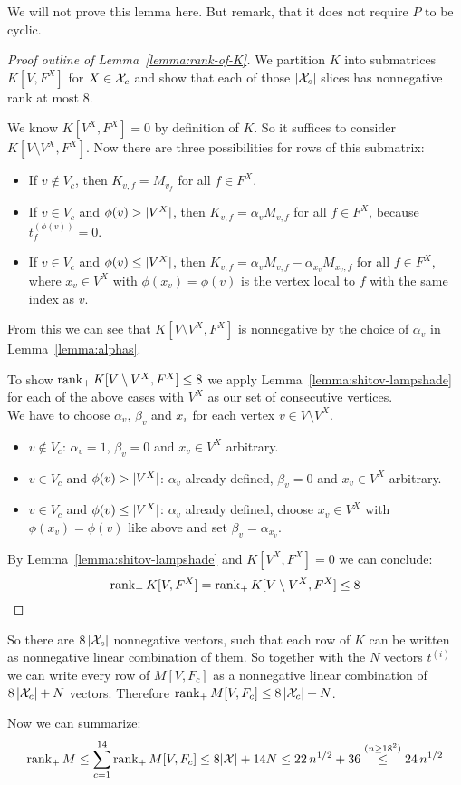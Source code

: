 We will not prove this lemma here. But remark, that it does not require $P$ to be cyclic.

\begin{proof}[Proof outline of Lemma~\ref{lemma:rank-of-K}]
  We partition $K$ into submatrices $K[V,F^X]$ for $X \in \mathcal{X}_c$ and show that each of those $\lvert\mathcal{X}_c\rvert$ slices has nonnegative rank at most $8$.

  We know $K[V^X,F^X] = 0$ by definition of $K$. So it suffices to consider $K[V \setminus V^X, F^X]$. Now there are three possibilities for rows of this submatrix:

  \begin{itemize}
    \item If $v \notin V_c$, then $K_{v,f} = M_{v_f}$ for all $f \in F^X$.
    \item If $v \in V_c$ and $\phi(v) > \lvert V^X\rvert$, then $K_{v,f} = \alpha_v M_{v,f}$ for all $f \in F^X$, because $t_f^{(\phi(v))} = 0$.
    \item If $v \in V_c$ and $\phi(v) \leq \lvert V^X\rvert$, then $K_{v,f} = \alpha_v M_{v,f} - \alpha_{x_v} M_{x_v,f}$ for all $f \in F^X$, where $x_v \in V^X$ with $\phi(x_v) = \phi(v)$ is the vertex local to $f$ with the same index as $v$.
  \end{itemize}

  From this we can see that $K[V \setminus V^X, F^X]$ is nonnegative by the choice of $\alpha_v$ in Lemma~\ref{lemma:alphas}.

  To show $\operatorname{rank}_+ K[V \setminus V^X, F^X] \leq 8$ we apply Lemma~\ref{lemma:shitov-lampshade} for each of the above cases with $V^X$ as our set of consecutive vertices.\\
  We have to choose $\alpha_v$, $\beta_v$ and $x_v$ for each vertex $v \in V \setminus V^X$.

  \begin{itemize}
    \item $v \notin V_c$: $\alpha_v = 1$, $\beta_v = 0$ and $x_v \in V^X$ arbitrary.
    \item $v \in V_c$ and $\phi(v) > \lvert V^X\rvert$: $\alpha_v$ already defined, $\beta_v = 0$ and $x_v \in V^X$ arbitrary.
    \item $v \in V_c$ and $\phi(v) \leq \lvert V^X\rvert$: $\alpha_v$ already defined, choose $x_v \in V^X$ with $\phi(x_v) = \phi(v)$ like above and set $\beta_v = \alpha_{x_v}$.
  \end{itemize}

  By Lemma~\ref{lemma:shitov-lampshade} and $K[V^X,F^X] = 0$ we can conclude: $$\operatorname{rank}_+ K[V,F^X] = \operatorname{rank}_+ K[V \setminus V^X,F^X] \leq 8$$
\end{proof}

So there are $8\,\lvert\mathcal{X}_c\rvert$ nonnegative vectors, such that each row of $K$ can be written as nonnegative linear combination of them. So together with the $N$ vectors $t^{(i)}$ we can write every row of $M[V,F_c]$ as a nonnegative linear combination of $8\,\lvert\mathcal{X}_c\rvert + N$ vectors. Therefore $\operatorname{rank}_+ M[V,F_c] \leq 8\,\lvert\mathcal{X}_c\rvert + N$.

Now we can summarize: $$\operatorname{rank}_+ M \leq \sum_{c=1}^{14} \operatorname{rank}_+ M[V,F_c] \leq 8\lvert\mathcal{X}\rvert + 14N \leq 22\,n^{1/2} + 36 \stackrel{(n \geq 18^2)}{\leq} 24\,n^{1/2}$$
